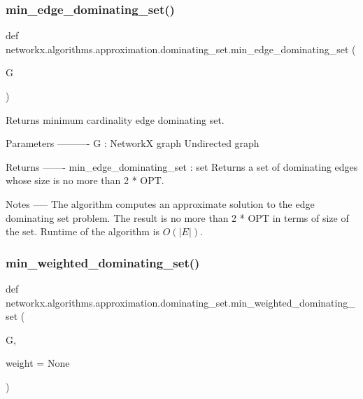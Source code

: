 \subsubsection{\texorpdfstring{min\+\_\+edge\+\_\+dominating\+\_\+set()}{min\_edge\_dominating\_set()}}
{\footnotesize\ttfamily def networkx.\+algorithms.\+approximation.\+dominating\+\_\+set.\+min\+\_\+edge\+\_\+dominating\+\_\+set (\begin{DoxyParamCaption}\item[{}]{G }\end{DoxyParamCaption})}

\begin{DoxyVerb}Returns minimum cardinality edge dominating set.

Parameters
----------
G : NetworkX graph
  Undirected graph

Returns
-------
min_edge_dominating_set : set
  Returns a set of dominating edges whose size is no more than 2 * OPT.

Notes
-----
The algorithm computes an approximate solution to the edge dominating set
problem. The result is no more than 2 * OPT in terms of size of the set.
Runtime of the algorithm is $O(|E|)$.
\end{DoxyVerb}
 \mbox{\label{namespacenetworkx_1_1algorithms_1_1approximation_1_1dominating__set_a5404da3f7c2e2af8fa3f63875171a1c2}} 
\subsubsection{\texorpdfstring{min\+\_\+weighted\+\_\+dominating\+\_\+set()}{min\_weighted\_dominating\_set()}}
{\footnotesize\ttfamily def networkx.\+algorithms.\+approximation.\+dominating\+\_\+set.\+min\+\_\+weighted\+\_\+dominating\+\_\+set (\begin{DoxyParamCaption}\item[{}]{G,  }\item[{}]{weight = {\ttfamily None} }\end{DoxyParamCaption})}

